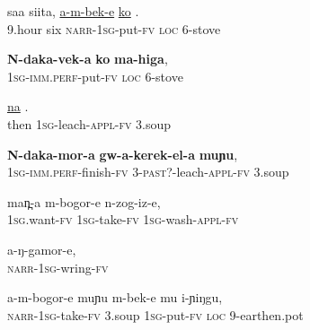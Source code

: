 \documentclass[output=paper]{LSP/langsci}
\begin{document}
 \begin{exe}
\ex \label{Saapp13}
\gll saa siita,  \underline{a-m-bek-e} \underline{ko} \underline{}.\\
9.hour  six  \textsc{narr}-\textsc{1sg}-put-\textsc{fv}  \textsc{loc} 6-stove\\
\glt {}
\end{exe}

 \begin{exe}
\ex \label{Saapp14}
\gll \textbf{N-daka-vek-a} \textbf{ko} \textbf{ma-higa},\\
\textsc{1sg-imm}.\textsc{perf}-put-\textsc{fv}  \textsc{loc}  6-stove\\
\glt {}
\end{exe}

 \begin{exe}
\ex \label{Saapp15}
\gll \underline{na} \underline{} \underline{}.\\
then  \textsc{1sg}-leach-\textsc{appl}-\textsc{fv} 3.soup\\
\glt {}
\end{exe}

 \begin{exe}
\ex \label{Saapp16}
\gll \textbf{N-daka-mor-a} \textbf{gw-a-kerek-el-a} \textbf{muɲu},\\
\textsc{1sg}-\textsc{imm.perf}-finish-\textsc{fv} 3-\textsc{past}?-leach-\textsc{appl}-\textsc{fv}  3.soup  \\
\glt {}
\end{exe}

 \begin{exe}
\ex \label{Saapp17}
\gll man̪-a m-bogor-e n-zog-iz-e,\\
\textsc{1sg}.want-\textsc{fv}  \textsc{1sg}-take-\textsc{fv}  \textsc{1sg}-wash-\textsc{appl}-\textsc{fv}\\
\glt {}
\end{exe}

 \begin{exe}
\ex \label{Saapp18}
\gll a-ŋ-gamor-e,\\
\textsc{narr}-\textsc{1sg}-wring-\textsc{fv}\\
\glt {}
\end{exe}

 \begin{exe}
\ex \label{Saapp19}
\gll a-m-bogor-e muɲu m-bek-e mu i-ɲiŋgu,\\
\textsc{narr}-\textsc{1sg}-take-\textsc{fv}  3.soup    \textsc{1sg}-put-\textsc{fv}  \textsc{loc}  9-earthen.pot\\
\glt {}
\end{exe}
\end{document}
